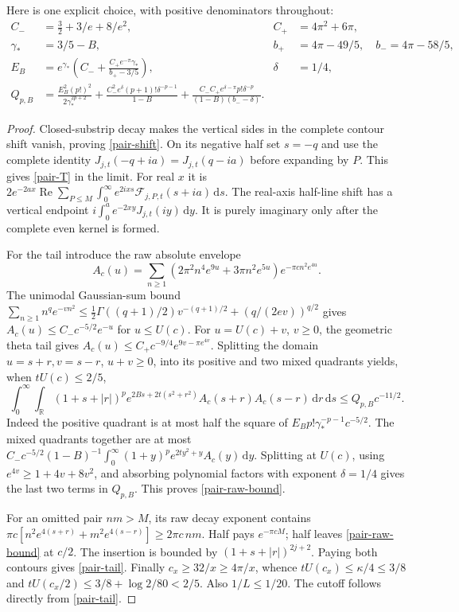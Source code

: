 \documentclass[11pt]{article}
\theoremstyle{definition}
\theoremstyle{remark}
\newcommand{\dd}{\,\mathrm d}
\newcommand{\Rea}{\operatorname{Re}}
\begin{document}
Here is one explicit choice, with positive denominators throughout:
\begin{align*}
 C_-&=\tfrac32+3/e+8/e^2,& C_+&=4\pi^2+6\pi,\\
 \gamma_*&=3/5-B,& b_+&=4\pi-49/5,\quad b_-=4\pi-58/5,\\
 E_B&=e^{\gamma_*}
 \left(C_-+\frac{C_+e^{-\pi}\gamma_*}{b_+-3/5}\right),&
 \delta&=1/4,\\
 Q_{p,B}&=\frac{E_B^2(p!)^2}{2\gamma_*^{2p+2}}
 +\frac{C_-^2e^\delta(p+1)!\delta^{-p-1}}{1-B}
 +\frac{C_-C_+e^{\delta-\pi}p!\delta^{-p}}
 {(1-B)(b_--\delta)}.
\end{align*}
\begin{proof}
Closed-substrip decay makes the vertical sides in the complete contour
shift vanish, proving \eqref{pair-shift}. On its negative half set
$s=-q$ and use the complete identity $J_{j,t}(-q+ia)=J_{j,t}(q-ia)$
before expanding by $P$. This gives \eqref{pair-T} in the limit.
For real $x$ it is
$2e^{-2ax}\Rea\sum_{P\le M}\int_0^\infty
e^{2ixs}\mathcal F_{j,P,t}(s+ia)\dd s$.
The real-axis half-line shift has a vertical endpoint
$i\int_0^a e^{-2xy}J_{j,t}(iy)\dd y$.
It is purely imaginary only after the complete even kernel is formed.

For the tail introduce the raw absolute envelope
\[
 A_c(u)=\sum_{n\ge1}(2\pi^2n^4e^{9u}+3\pi n^2e^{5u})
 e^{-\pi c n^2e^{4u}}.
\]
The unimodal Gaussian-sum bound
$\sum_{n\ge1}n^q e^{-vn^2}\le
\tfrac12\Gamma((q+1)/2)v^{-(q+1)/2}
 +(q/(2ev))^{q/2}$
gives $A_c(u)\le C_-c^{-5/2}e^{-u}$ for $u\le U(c)$.
For $u=U(c)+v$, $v\ge0$, the geometric theta tail gives
$A_c(u)\le C_+c^{-9/4}e^{9v-\pi e^{4v}}$.
Splitting the domain $u=s+r,v=s-r$, $u+v\ge0$, into its positive
and two mixed quadrants yields, when $tU(c)\le2/5$,
\begin{equation}
 \int_0^\infty\!\int_{\mathbb R}(1+s+|r|)^p
 e^{2Bs+2t(s^2+r^2)}A_c(s+r)A_c(s-r)\dd r\dd s
 \le Q_{p,B}c^{-11/2}. \label{pair-raw-bound}
\end{equation}
Indeed the positive quadrant is at most half the square of
$E_Bp!\gamma_*^{-p-1}c^{-5/2}$.
The mixed quadrants together are at most
$C_-c^{-5/2}(1-B)^{-1}
\int_0^\infty(1+y)^pe^{2ty^2+y}A_c(y)\dd y$.
Splitting at $U(c)$, using $e^{4v}\ge1+4v+8v^2$, and absorbing
polynomial factors with exponent $\delta=1/4$ gives the last two
terms in $Q_{p,B}$. This proves \eqref{pair-raw-bound}.

For an omitted pair $nm>M$, its raw decay exponent contains
$\pi c[n^2e^{4(s+r)}+m^2e^{4(s-r)}]\ge2\pi c\,nm$.
Half pays $e^{-\pi cM}$; half leaves \eqref{pair-raw-bound} at $c/2$.
The insertion is bounded by $(1+s+|r|)^{2j+2}$.
Paying both contours gives \eqref{pair-tail}.
Finally $c_x\ge32/x\ge4\pi/x$, whence $tU(c_x)\le\kappa/4\le3/8$ and
$tU(c_x/2)\le3/8+\log2/80<2/5$. Also $1/L\le1/20$.
The cutoff follows directly from \eqref{pair-tail}.
\end{proof}
\end{document}
